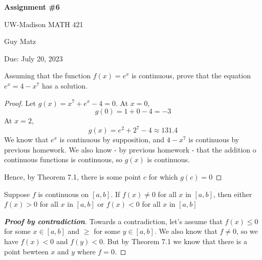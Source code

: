 \documentclass{article} %
\theoremstyle{plain}
\theoremstyle{definition}
\begin{document}
\begin{center}
\Large{\textbf{Assignment \#6}
            
UW-Madison MATH 421} 
\vspace{5pt}
        
\normalsize{  Guy Matz
        
Due: July 20, 2023   }
\vspace{15pt}
        
\end{center}


\noindent{} Assuming that the function $f(x) = e^x$ is continuous, prove that the equation $e^x = 4-x^7$ has a solution. 

\begin{proof} 
  Let $g(x) = x^7 + e^x -4 = 0$.  At $x =0$,
  \[ g(0)=1 + 0 -4 = -3 \]
  At $x = 2$,
  \[ g(x)=e^2 + 2^7-4 \approx 131.4 \]
  We know that $e^x$ is continuous by supposition, and $4 - x^7$ is
  continuous by previous homework.  We also know - by previous homework -
  that the addition o continuous functions is continuous, so $g(x)$ is
  continuous.


  Hence, by Theorem 7.1, there is some point $c$ for which $g(c)=0$
\end{proof} 

\newpage
\noindent{} Suppose $f$ is continuous on $[a,b]$. If $f(x) \neq 0$ for all $x$ in $[a,b]$, then either $f(x) > 0$ for all $x$ in $[a,b]$ or $f(x) < 0$ for all $x$ in $[a,b]$

\begin{proof}[\textbf{Proof by contradiction}]  Towards a contradiction,
  let's assume that $f(x) \leq 0$ for some $x \in [a,b]$ and $ \geq$ for 
  some $y \in [a,b]$.  We also know that $f \neq 0$, so we have $f(x) < 0$
  and $f(y) < 0$.  But by Theorem 7.1 we know that there is a point
  bewteen $x$ and $y$ where $f = 0$.
\end{proof} 
\end{document}
